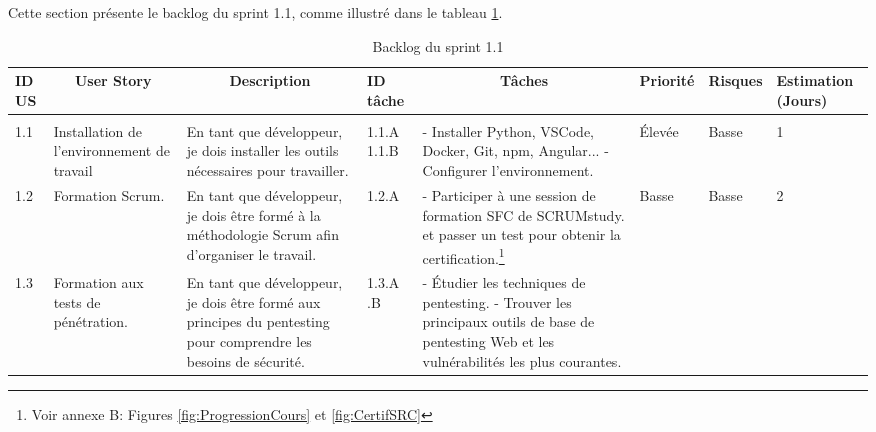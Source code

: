 Cette section présente le backlog du sprint 1.1, comme illustré dans le tableau \ref{tab:backlogS11}.
\begin{landscape}
    \renewcommand{\arraystretch}{1.37}
    \begin{spacing}{0.94}
        \begin{longtable}{|p{0.7cm}|p{2.4cm}|p{6cm}|p{1cm}|p{7.2cm}|p{0.2cm}|p{0.2cm}|p{2cm}|}
            \caption{Backlog du sprint 1.1} \label{tab:backlogS11} \\\hline
            \rowcolor{gray!20}
            \textbf{\small ID US} & 
            \multicolumn{1}{c|}{\textbf{\small User Story}} & 
            \multicolumn{1}{c|}{\textbf{\small Description}} & 
            \textbf{\small ID tâche}& 
            \multicolumn{1}{c|}{\textbf{\small Tâches}} & 
            \multicolumn{1}{c|}{\textbf{\small Priorité}} & 
            \multicolumn{1}{c|}{\textbf{\small Risques}} & 
            \textbf{\small Estimation (Jours)}\\\hline
            \hline  
            \rowcolor{blue!20}
			\multicolumn{8}{|c|}{\textbf{EPIC 1: Initialisation du projet}} \\\hline
            1.1 & Installation de l’environnement de travail 
                  & En tant que développeur, je dois installer les outils nécessaires pour travailler. & 1.1.A \newline\vspace{0.5cm} 1.1.B
            & - Installer Python, VSCode, Docker, Git, npm, Angular...\newline
            - Configurer l'environnement. & Élevée & Basse & 1 \\\hline
            1.2 & Formation Scrum. 
                  & En tant que développeur, je dois être formé à la méthodologie Scrum afin d’organiser le travail. 
              & 1.2.A & 
                - Participer à une session de formation SFC de SCRUMstudy. et passer un test pour obtenir la certification.\footnote{Voir annexe B: Figures \ref{fig:ProgressionCours} et \ref{fig:CertifSRC}}
        & Basse & Basse & 2 \\
            \hline
        1.3 & Formation aux tests de pénétration. 
            & En tant que développeur, je dois être formé aux principes du pentesting pour comprendre les besoins de sécurité. 
            & 1.3.A \newline1.3.B 
            & 
            - Étudier les techniques de pentesting. \newline
            - Trouver les principaux outils de base de pentesting Web et les vulnérabilités les plus courantes.

\end{longtable}
\end{spacing}
\end{landscape}
